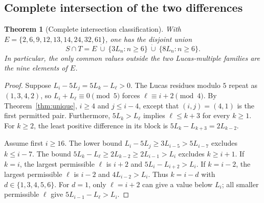 \documentclass[11pt]{article}
\newtheorem{theorem}{Theorem}[section]
\begin{document}
\subsection{Complete intersection of the two differences}
\begin{theorem}[Complete intersection classification]\label{oeis:thm:intersection}
With $E=\{2,6,9,12,13,14,24,32,61\}$, one has the disjoint union
\begin{equation}\label{oeis:eq:intersection}
\boxed{\quad S\cap T=E\ \dot\cup\
\{3L_n:n\ge6\}\ \dot\cup\ \{8L_n:n\ge6\}.\quad}
\end{equation}
In particular, the only common values outside the two Lucas-multiple
families are the nine elements of $E$.
\end{theorem}
\begin{proof}
Suppose $L_i-5L_j=5L_k-L_\ell>0$.
The Lucas residues modulo $5$ repeat as $(1,3,4,2)$, so
$L_i+L_\ell\equiv0\pmod5$ forces
$\ell\equiv i+2\pmod4$.
By Theorem~\ref{thm:unique}, $i\ge4$ and $j\le i-4$, except
that $(i,j)=(4,1)$ is the first permitted pair. Furthermore,
$5L_k>L_\ell$ implies $\ell\le k+3$ for every $k\ge1$.
For $k\ge2$, the least positive difference in its block is
$5L_k-L_{k+3}=2L_{k-2}$.

Assume first $i\ge16$. The lower bound
$L_i-5L_j\ge3L_{i-5}>5L_{i-7}$ excludes $k\le i-7$.
The bound $5L_k-L_\ell\ge2L_{k-2}\ge2L_{i-1}>L_i$
excludes $k\ge i+1$. If $k=i$, the largest permissible
$\ell$ is $i+2$ and $5L_i-L_{i+2}>L_i$.
If $k=i-2$, the largest permissible $\ell$ is $i-2$ and
$4L_{i-2}>L_i$. Thus $k=i-d$ with $d\in\{1,3,4,5,6\}$.
For $d=1$, only $\ell=i+2$ can give a value below $L_i$;
all smaller permissible $\ell$ give $5L_{i-1}-L_\ell>L_i$.


\end{proof}
\end{document}
